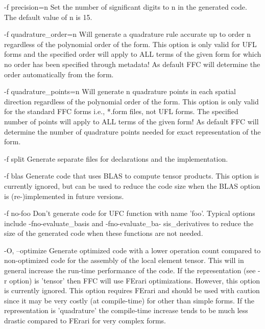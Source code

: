        -f precision=n
              Set the number of significant digits to n in the generated code.
              The default value of n is 15.

       -f quadrature_order=n
              Will generate a quadrature rule accurate up to order n regardless
              of the polynomial order of the form. This option is only valid
              for UFL forms and the specified order will apply to ALL terms of
              the given form for which no order has been specified through
              metadata! As default FFC will determine the order automatically
              from the form.

       -f quadrature_points=n
              Will generate n quadrature points in each spatial direction
              regardless of the polynomial order of the form. This option is
              only valid for the standard FFC forms i.e., *.form files, not
              UFL forms. The specified number of points will apply to ALL terms
              of the given form! As default FFC will determine the number of
              quadrature points needed for exact representation of the form.

       -f split
              Generate separate files for declarations and the implementation.

       -f blas
              Generate  code that uses BLAS to compute tensor products.  This
              option is currently ignored, but can be used to reduce the code
              size when the BLAS option is (re-)implemented in future versions.

       -f no-foo
              Don't generate code for UFC function with name 'foo'. Typical
              options   include   -fno-evaluate_basis   and  -fno-evaluate_ba-
              sis_derivatives to reduce the size  of  the generated code when
              these functions are not needed.

       -O, --optimize
              Generate optimized code with a lower operation  count compared to
              non-optimized code for the assembly of  the local element tensor.
              This  will  in  general increase the  run-time performance of the
              code. If  the representation (see -r option) is 'tensor' then FFC
              will use FErari optimizations. However, this option is  currently
              ignored. This  option  requires  FErari  and  should be used with
              caution since it may be very costly (at compile-time)  for  other
              than  simple  forms.  If the representation is  'quadrature'  the
              compile-time increase tends to be  much  less drastic compared to
              FErari for very complex forms.

